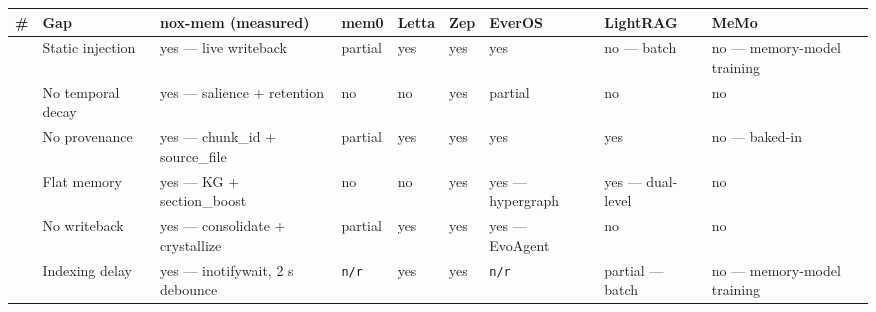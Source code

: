 \documentclass[
]{article}
\newcounter{none} %
\begin{document}
{\def\LTcaptype{none} %
\begin{longtable}[]{@{}
  >{\raggedright\arraybackslash}p{}
  >{\raggedright\arraybackslash}p{}
  >{\centering\arraybackslash}p{}
  >{\centering\arraybackslash}p{}
  >{\centering\arraybackslash}p{}
  >{\centering\arraybackslash}p{}
  >{\centering\arraybackslash}p{}
  >{\centering\arraybackslash}p{}
  >{\centering\arraybackslash}p{}@{}}
\toprule\noalign{}
\begin{minipage}[b]{\linewidth}\raggedright
\#
\end{minipage} & \begin{minipage}[b]{\linewidth}\raggedright
Gap
\end{minipage} & \begin{minipage}[b]{\linewidth}\centering
nox-mem (measured)
\end{minipage} & \begin{minipage}[b]{\linewidth}\centering
mem0
\end{minipage} & \begin{minipage}[b]{\linewidth}\centering
Letta
\end{minipage} & \begin{minipage}[b]{\linewidth}\centering
Zep
\end{minipage} & \begin{minipage}[b]{\linewidth}\centering
EverOS
\end{minipage} & \begin{minipage}[b]{\linewidth}\centering
LightRAG
\end{minipage} & \begin{minipage}[b]{\linewidth}\centering
MeMo
\end{minipage} \\
\midrule\noalign{}
\endhead
\bottomrule\noalign{}
\endlastfoot
1 & Static injection & yes --- live writeback & partial & yes & yes &
yes & no --- batch & no --- memory-model training \\
2 & No temporal decay & yes --- salience + retention & no & no & yes &
partial & no & no \\
3 & No provenance & yes --- chunk\_id + source\_file & partial & yes &
yes & yes & yes & no --- baked-in \\
4 & Flat memory & yes --- KG + section\_boost & no & no & yes & yes ---
hypergraph & yes --- dual-level & no \\
5 & No writeback & yes --- consolidate + crystallize & partial & yes &
yes & yes --- EvoAgent & no & no \\
6 & Indexing delay & yes --- inotifywait, 2 s debounce & \texttt{n/r} &
yes & yes & \texttt{n/r} & partial --- batch & no --- memory-model
training \\
\end{longtable}
}
\end{document}
